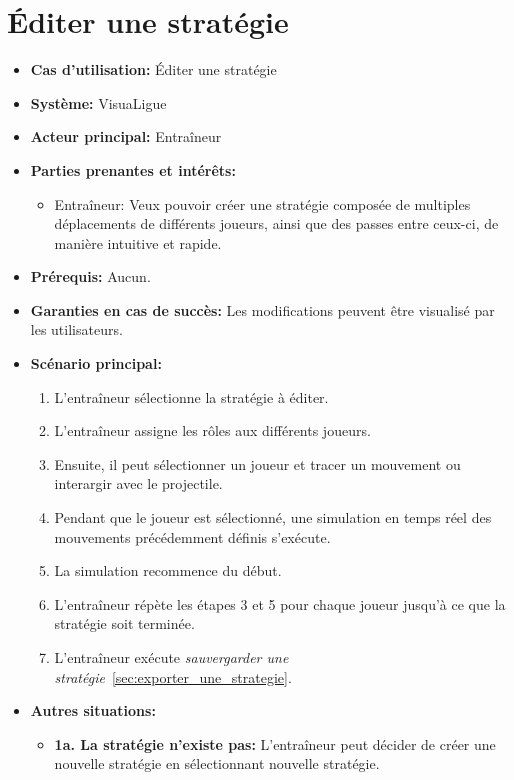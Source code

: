 \section{\'Editer une stratégie}
\label{sec:ajouter_une_strategie}
\begin{itemize}
    \item \textbf{Cas d'utilisation:} \'Editer une strat\'egie
    \item \textbf{Syst\`eme:} VisuaLigue
    \item \textbf{Acteur principal:} Entra\^ineur
    \item \textbf{Parties prenantes et int\'er\^ets:}
        \begin{itemize}
            \item Entraîneur: Veux pouvoir créer une stratégie composée de multiples déplacements de différents joueurs, ainsi que des passes entre ceux-ci, de manière intuitive et rapide.
        \end{itemize}
    \item \textbf{Pr\'erequis:} Aucun.
    \item \textbf{Garanties en cas de succ\`es:} Les modifications peuvent être visualisé par les utilisateurs.
    \item \textbf{Sc\'enario principal:}
        \begin{enumerate}
            \item L'entraîneur sélectionne la stratégie à éditer.
            \item L'entraîneur assigne les r\^oles aux diff\'erents joueurs.
            \item Ensuite, il peut s\'electionner un joueur et tracer un mouvement ou interargir avec le projectile.
            \item Pendant que le joueur est s\'electionn\'e, une simulation en temps r\'eel des mouvements pr\'ec\'edemment d\'efinis s'ex\'ecute.
            \item La simulation recommence du d\'ebut.
            \item L'entraîneur répète les étapes 3 et 5 pour chaque joueur jusqu'à ce que la stratégie soit terminée.
            \item L'entraîneur exécute \textit{sauvergarder une stratégie}~\ref{sec:exporter_une_strategie}.
    \end{enumerate}
    \item \textbf{Autres situations:}
        \begin{itemize}
            \item \textbf{1a. La stratégie n'existe pas:} L'entraîneur peut décider de créer une nouvelle stratégie en sélectionnant nouvelle stratégie.

\end{itemize}
\end{itemize}

